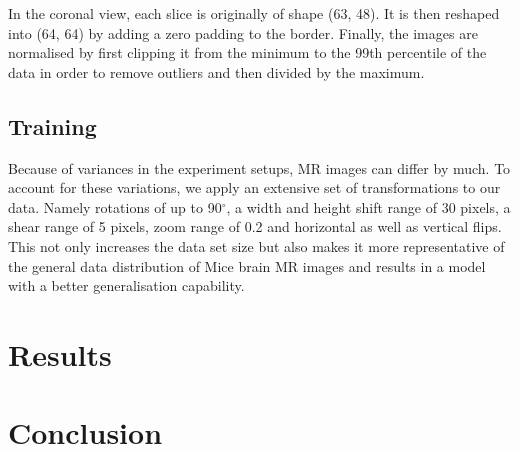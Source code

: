 \documentclass{article}
\begin{document}
In the coronal view, each slice is originally of shape (63, 48). 
It is then reshaped into (64, 64) by adding a zero padding to the border. 
Finally, the images are normalised by first clipping it from the minimum to the 99th percentile of the data in order to remove outliers and then divided by the maximum.

\subsection{Training}

Because of variances in the experiment setups, MR images can differ by much. 
To account for these variations, we apply an extensive set of transformations to our data. Namely rotations of up to 90$^{\circ}$, a width and height shift range of 30 pixels, a shear range of 5 pixels, zoom range of 0.2 and horizontal as well as vertical flips.
This not only increases the data set size but also makes it more representative of the general data distribution of Mice brain MR images and results in a model with a better generalisation capability.
  
\section{Results}

\section{Conclusion}


  

\end{document}
